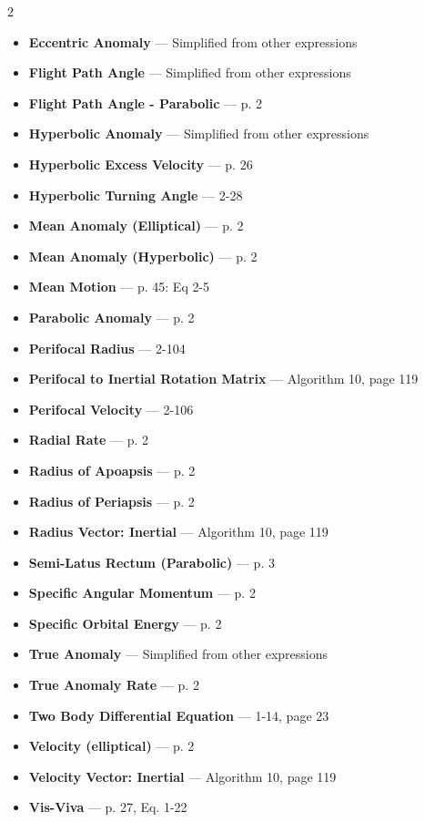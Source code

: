 \documentclass[10pt]{article}
\begin{document}
\begin{footnotesize}
\begin{multicols}{2}
\begin{itemize}[noitemsep,topsep=0pt,parsep=0pt,partopsep=0pt]
\item \textbf{Eccentric Anomaly} --- Simplified from other expressions
\item \textbf{Flight Path Angle} --- Simplified from other expressions
\item \textbf{Flight Path Angle - Parabolic} --- p. 2
\item \textbf{Hyperbolic Anomaly} --- Simplified from other expressions
\item \textbf{Hyperbolic Excess Velocity} --- p. 26
\item \textbf{Hyperbolic Turning Angle} --- 2-28
\item \textbf{Mean Anomaly (Elliptical)} --- p. 2
\item \textbf{Mean Anomaly (Hyperbolic)} --- p. 2
\item \textbf{Mean Motion} --- p. 45: Eq 2-5
\item \textbf{Parabolic Anomaly} --- p. 2
\item \textbf{Perifocal Radius} --- 2-104
\item \textbf{Perifocal to Inertial Rotation Matrix} --- Algorithm 10, page 119
\item \textbf{Perifocal Velocity} --- 2-106
\item \textbf{Radial Rate} --- p. 2
\item \textbf{Radius of Apoapsis} --- p. 2
\item \textbf{Radius of Periapsis} --- p. 2
\item \textbf{Radius Vector: Inertial} --- Algorithm 10, page 119
\item \textbf{Semi-Latus Rectum (Parabolic)} --- p. 3
\item \textbf{Specific Angular Momentum} --- p. 2
\item \textbf{Specific Orbital Energy} --- p. 2
\item \textbf{True Anomaly} --- Simplified from other expressions
\item \textbf{True Anomaly Rate} --- p. 2
\item \textbf{Two Body Differential Equation} --- 1-14, page 23
\item \textbf{Velocity (elliptical)} --- p. 2
\item \textbf{Velocity Vector: Inertial} --- Algorithm 10, page 119
\item \textbf{Vis-Viva} --- p. 27, Eq. 1-22
\end{itemize}
\end{multicols}
\end{footnotesize}
\vspace{0.75em}
\end{document}
